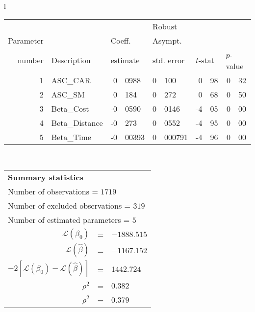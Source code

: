   \begin{tabular}{l}
\begin{tabular}{rlr@{.}lr@{.}lr@{.}lr@{.}l}
         &                       &   \multicolumn{2}{l}{}    & \multicolumn{2}{l}{Robust}  &     \multicolumn{4}{l}{}   \\
Parameter &                       &   \multicolumn{2}{l}{Coeff.}      & \multicolumn{2}{l}{Asympt.}  &     \multicolumn{4}{l}{}   \\
number &  Description                     &   \multicolumn{2}{l}{estimate}      & \multicolumn{2}{l}{std. error}  &   \multicolumn{2}{l}{$t$-stat}  &   \multicolumn{2}{l}{$p$-value}   \\

\hline

1 & ASC_CAR & 0&0988 & 0&100 & 0&98 & 0&32\\
2 & ASC_SM & 0&184 & 0&272 & 0&68 & 0&50\\
3 & Beta_Cost & -0&0590 & 0&0146 & -4&05 & 0&00\\
4 & Beta_Distance & -0&273 & 0&0552 & -4&95 & 0&00\\
5 & Beta_Time & -0&00393 & 0&000791 & -4&96 & 0&00\\
\hline
\end{tabular}
\\
\begin{tabular}{rcl}
\multicolumn{3}{l}{\bf Summary statistics}\\
\multicolumn{3}{l}{ Number of observations = $1719$} \\
\multicolumn{3}{l}{ Number of excluded observations = $319$} \\
\multicolumn{3}{l}{ Number of estimated  parameters = $5$} \\
 $\mathcal{L}(\beta_0)$ &=&  $-1888.515$ \\
 $\mathcal{L}(\hat{\beta})$ &=& $-1167.152 $  \\
 $-2[\mathcal{L}(\beta_0) -\mathcal{L}(\hat{\beta})]$ &=& $1442.724$ \\
    $\rho^2$ &=&   $0.382$ \\
    $\bar{\rho}^2$ &=&    $0.379$ \\
\end{tabular}
  \end{tabular}
